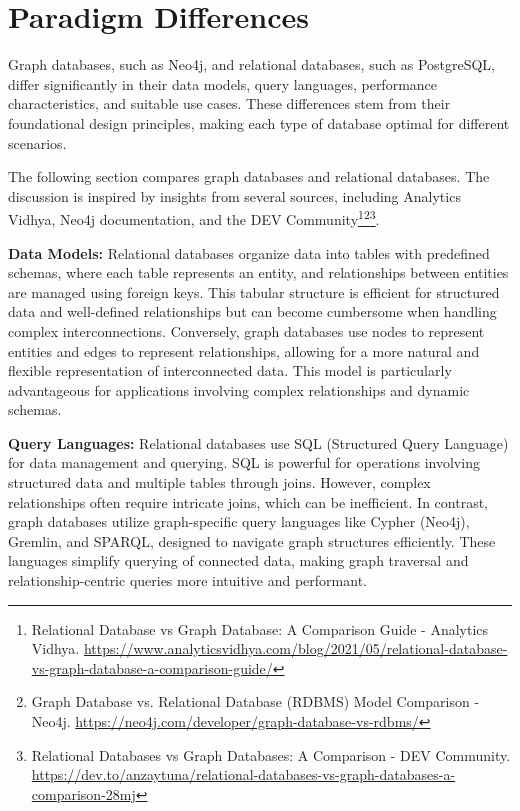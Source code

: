 \section{Paradigm Differences}
Graph databases, such as Neo4j, and relational databases, such as PostgreSQL, differ significantly in their data models, query languages, performance characteristics, and suitable use cases. These differences stem from their foundational design principles, making each type of database optimal for different scenarios.

The following section compares graph databases and relational databases. The discussion is inspired by insights from several sources, including Analytics Vidhya, Neo4j documentation, and the DEV Community\footnote{Relational Database vs Graph Database: A Comparison Guide - Analytics Vidhya. \url{https://www.analyticsvidhya.com/blog/2021/05/relational-database-vs-graph-database-a-comparison-guide/}}\footnote{Graph Database vs. Relational Database (RDBMS) Model Comparison - Neo4j. \url{https://neo4j.com/developer/graph-database-vs-rdbms/}}\footnote{Relational Databases vs Graph Databases: A Comparison - DEV Community. \url{https://dev.to/anzaytuna/relational-databases-vs-graph-databases-a-comparison-28mj}}.

\textbf{Data Models:} Relational databases organize data into tables with predefined schemas, where each table represents an entity, and relationships between entities are managed using foreign keys. This tabular structure is efficient for structured data and well-defined relationships but can become cumbersome when handling complex interconnections. Conversely, graph databases use nodes to represent entities and edges to represent relationships, allowing for a more natural and flexible representation of interconnected data. This model is particularly advantageous for applications involving complex relationships and dynamic schemas.

\textbf{Query Languages:} Relational databases use SQL (Structured Query Language) for data management and querying. SQL is powerful for operations involving structured data and multiple tables through joins. However, complex relationships often require intricate joins, which can be inefficient. In contrast, graph databases utilize graph-specific query languages like Cypher (Neo4j), Gremlin, and SPARQL, designed to navigate graph structures efficiently. These languages simplify querying of connected data, making graph traversal and relationship-centric queries more intuitive and performant.

